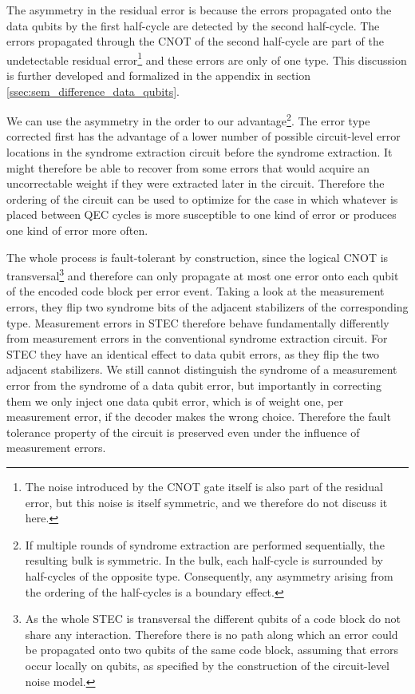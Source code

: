 The asymmetry in the residual error is because the errors propagated onto the data qubits by the first half-cycle are detected by the second half-cycle.
The errors propagated through the CNOT of the second half-cycle are part of the undetectable residual error\footnote{
    The noise introduced by the CNOT gate itself is also part of the residual error, but this noise is itself symmetric, and we therefore do not discuss it here.
} and these errors are only of one type. 
This discussion is further developed and formalized in the appendix in section \ref{ssec:sem_difference_data_qubits}.

We can use the asymmetry in the order to our advantage\footnote{
    If multiple rounds of syndrome extraction are performed sequentially, the resulting bulk is symmetric. 
    In the bulk, each half-cycle is surrounded by half-cycles of the opposite type.
    Consequently, any asymmetry arising from the ordering of the half-cycles is a boundary effect.
}. 
The error type corrected first has the advantage of a lower number of possible circuit-level error locations in the syndrome extraction circuit before the syndrome extraction.
It might therefore be able to recover from some errors that would acquire an uncorrectable weight if they were extracted later in the circuit. 
Therefore the ordering of the circuit can be used to optimize for the case in which whatever is placed between QEC cycles is more susceptible to one kind of error or produces one kind of error more often. 

The whole process is fault-tolerant by construction, since the logical CNOT is transversal\footnote{
    As the whole STEC is transversal the different qubits of a code block do not share any interaction. 
    Therefore there is no path along which an error could be propagated onto two qubits of the same code block, 
    assuming that errors occur locally on qubits,
    as specified by the construction of the circuit-level noise model. 
} and therefore can only propagate at most one error onto each qubit of the encoded code block per error event.
Taking a look at the measurement errors, they flip two syndrome bits of the adjacent stabilizers of the corresponding type. 
Measurement errors in STEC therefore behave fundamentally differently from measurement errors in the conventional syndrome extraction circuit.
For STEC they have an identical effect to data qubit errors, as they flip the two adjacent stabilizers. 
We still cannot distinguish the syndrome of a measurement error from the syndrome of a data qubit error, 
but importantly in correcting them we only inject one data qubit error, which is of weight one, per measurement error, if the decoder makes the wrong choice.
Therefore the fault tolerance property of the circuit is preserved even under the influence of measurement errors.


